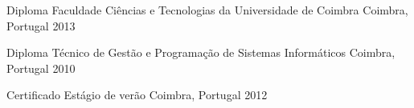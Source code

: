 




\begin{cvhonors}


\cvhonor
{Diploma} %
{Faculdade Ciências e Tecnologias da Universidade de Coimbra} %
{Coimbra, Portugal} %
{2013} %


\cvhonor
{Diploma} %
{Técnico de Gestão e Programação de Sistemas Informáticos} %
{Coimbra, Portugal} %
{2010} %


\cvhonor 
{Certificado} %
{Estágio de verão} %
{Coimbra, Portugal} %
{2012} %



\end{cvhonors}








